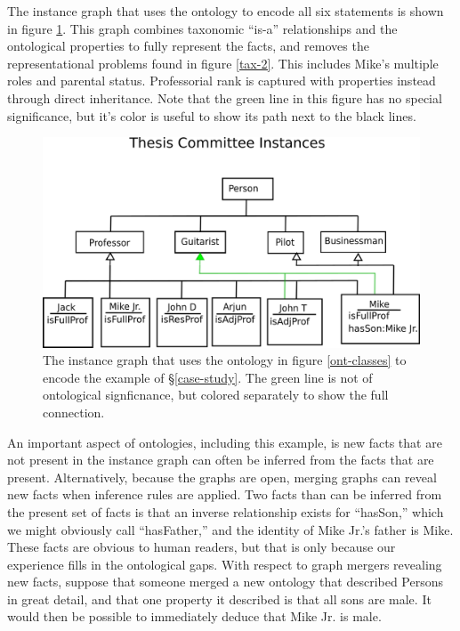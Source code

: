 The instance graph that uses the ontology to encode all six statements is shown
in figure \ref{ont-instances}. This graph combines taxonomic ``is-a''
relationships and the ontological properties to fully represent the facts,
and removes the representational problems found in figure \ref{tax-2}. This
includes Mike's multiple roles and parental status. Professorial rank is
captured with properties instead through direct inheritance. Note that the
green line in this figure has no special significance, but it's color is useful
to show its path next to the black lines.

\begin{figure}[htbp]
\centering
\includegraphics[width=\textwidth]{figures/tc-ont-instances.png}
\caption{The instance graph that uses the ontology in figure \ref{ont-classes}
to encode the example of \S \ref{case-study}. The green line is not of
ontological signficnance, but colored separately to show the full connection.}
\label{ont-instances}
\end{figure}

An important aspect of ontologies, including this example, is new facts that
are not present in the instance graph can often be inferred from the facts that
are present. Alternatively, because the graphs are open, merging graphs can
reveal new facts when inference rules are applied. Two facts than can be
inferred from the present set of facts is that an inverse relationship exists
for ``hasSon,'' which we might obviously call ``hasFather,'' and the identity of
Mike Jr.'s father is Mike. These facts are obvious to human readers, but that is
only because our experience fills in the ontological gaps. With respect to graph
mergers revealing new facts, suppose that someone merged a new ontology that
described Persons in great detail, and that one property it described is that
all sons are male. It would then be possible to immediately deduce that Mike Jr.
is male.

